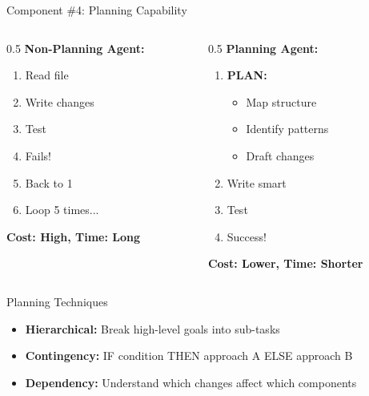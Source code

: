 \documentclass[aspectratio=169, 11pt]{beamer}
\begin{document}
\begin{frame}{Component \#4: Planning Capability}
    \begin{columns}[T]
        \begin{column}{0.5\textwidth}
            \textbf{Non-Planning Agent:}
            \begin{enumerate}
                \item Read file
                \item Write changes
                \item Test
                \item Fails!
                \item Back to 1
                \item Loop 5 times...
            \end{enumerate}

            \textcolor{UofSCRose}{\textbf{Cost: High, Time: Long}}
        \end{column}
        \begin{column}{0.5\textwidth}
            \textbf{Planning Agent:}
            \begin{enumerate}
                \item \textbf{PLAN:}
                \begin{itemize}
                    \item Map structure
                    \item Identify patterns
                    \item Draft changes
                \end{itemize}
                \item Write smart
                \item Test
                \item Success!
            \end{enumerate}

            \textcolor{UofSCHorseshoe}{\textbf{Cost: Lower, Time: Shorter}}
        \end{column}
    \end{columns}

    \vspace{0.5cm}
    \begin{block}{Planning Techniques}
        \begin{itemize}
            \item \textbf{Hierarchical:} Break high-level goals into sub-tasks
            \item \textbf{Contingency:} IF condition THEN approach A ELSE approach B
            \item \textbf{Dependency:} Understand which changes affect which components
        \end{itemize}
    \end{block}

\end{frame}
\end{document}
